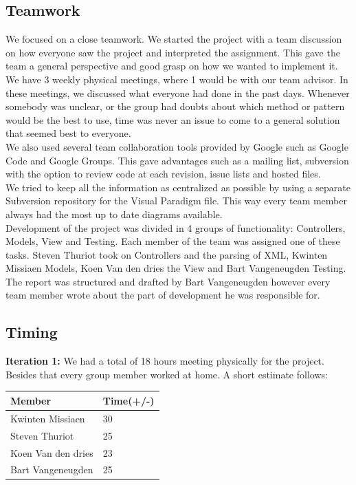 		\subsection{Teamwork}
		We focused on a close teamwork. We started the project with a team discussion on how everyone saw the project and interpreted the assignment. This gave the team a general perspective and good grasp on how we wanted to implement it.\\
		We have 3 weekly physical meetings, where 1 would be with our team advisor. In these meetings, we discussed what everyone had done in the past days. Whenever somebody was unclear, or the group had doubts about which method or pattern would be the best to use, time was never an issue to come to a general solution that seemed best to everyone.\\
		We also used several team collaboration tools provided by Google such as Google Code and Google Groups. This gave advantages such as a mailing list, subversion with the option to review code at each revision, issue lists and hosted files.\\
		We tried to keep all the information as centralized as possible by using a separate Subversion repository for the Visual Paradigm file. This way every team member always had the most up to date diagrams available.\\
		Development of the project was divided in 4 groups of functionality: Controllers, Models, View and Testing. Each member of the team was assigned one of these tasks. Steven Thuriot took on Controllers and the parsing of XML, Kwinten Missiaen Models, Koen Van den dries the View and Bart Vangeneugden Testing. The report was structured and drafted by Bart Vangeneugden however every team member wrote about the part of development he was responsible for.\\
		\subsection{Timing}
		\textbf{Iteration 1:}
		We had a total of 18 hours meeting physically for the project. Besides that every group member worked at home. A short estimate follows:\\
		 \begin{tabular}{l|l}
		Member & Time(+/-)\\ \hline
		Kwinten Missiaen & 30\\
		Steven Thuriot & 25\\
		Koen Van den dries & 23\\
		Bart Vangeneugden & 25\\
		\end{tabular}

